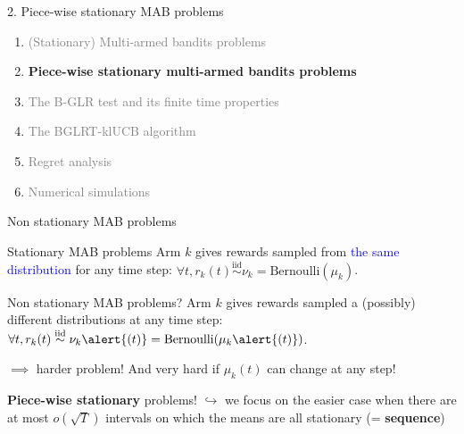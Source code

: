 \documentclass[11pt,english,ignorenonframetext,]{beamer}
\begin{document}
\begin{frame}{2. Piece-wise stationary MAB problems}

  \begin{enumerate}
    \item
    \textcolor{gray}{
      (Stationary) Multi-armed bandits problems
    }
    \vspace*{15pt}

    \item
    \alert{\textbf{%
      Piece-wise stationary multi-armed bandits problems
    }}
    \vspace*{15pt}

    \item
    \textcolor{gray}{
      The B-GLR test and its finite time properties
    }
    \vspace*{15pt}

    \item
    \textcolor{gray}{
      The BGLRT-klUCB algorithm
    }
    \vspace*{15pt}

    \item
    \textcolor{gray}{
      Regret analysis
    }
    \vspace*{15pt}

    \item
    \textcolor{gray}{
      Numerical simulations
    }
  \end{enumerate}

\end{frame}


\begin{frame}{Non stationary MAB problems}

  \begin{block}{Stationary MAB problems}
    Arm $k$ gives rewards sampled from \textcolor{blue}{the same distribution} for any time step:
    $\forall t, r_k(t) \overset{\text{iid}}{\sim} \nu_k = \mathrm{Bernoulli}(\mu_k)$.
  \end{block}

  \begin{alertblock}{Non stationary MAB problems?}
    Arm $k$ gives rewards sampled a \alert{(possibly) different distributions} at any time step:
    $\forall t, r_k(t) \overset{\text{iid}}{\sim} \nu_k\alert{(t)} = \mathrm{Bernoulli}(\mu_k\alert{(t)})$.
  \end{alertblock}

  \pause
  $\implies$ harder problem!
  And very hard if $\mu_k(t)$ can change at any step!

  \begin{block}{\textbf{Piece-wise stationary} problems!}
    $\hookrightarrow$ we focus on the easier case when there are at most $o(\sqrt{T})$ intervals on which the means are all stationary (= \textbf{sequence})
  \end{block}
\end{frame}
\end{document}
